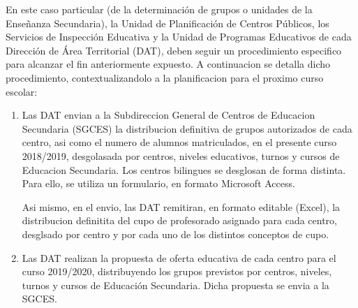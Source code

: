En este caso particular (de la determinación de grupos o unidades de la Enseñanza Secundaria), la Unidad de Planificación de Centros Públicos, los Servicios de Inspección Educativa y la Unidad de Programas Educativos de cada Dirección de Área Territorial (DAT), deben seguir un procedimiento especifico para alcanzar el fin anteriormente expuesto. A continuacion se detalla dicho procedimiento, contextualizandolo a la planificacion para el proximo curso escolar:

\begin{enumerate}
	\item Las DAT envian a la Subdireccion General de Centros de Educacion Secundaria (SGCES) la distribucion definitiva de grupos autorizados de cada centro, asi como el numero de alumnos matriculados, en el presente curso 2018/2019, desgolasada por centros, niveles educativos, turnos y cursos de Educacion Secundaria. Los centros bilingues se desglosan de forma distinta. Para ello, se utiliza un formulario, en formato Microsoft Access.
	
	Asi mismo, en el envio, las DAT remitiran, en formato editable (Excel), la distribucion definitita del cupo de profesorado asignado para cada centro, desglsado por centro y por cada uno de los distintos conceptos de cupo.
	\item Las DAT realizan la propuesta de oferta educativa de cada centro para el curso 2019/2020, distribuyendo los grupos previstos por centros, niveles, turnos y cursos de Educación Secundaria. Dicha propuesta se envia a la SGCES.
	

\end{enumerate}
